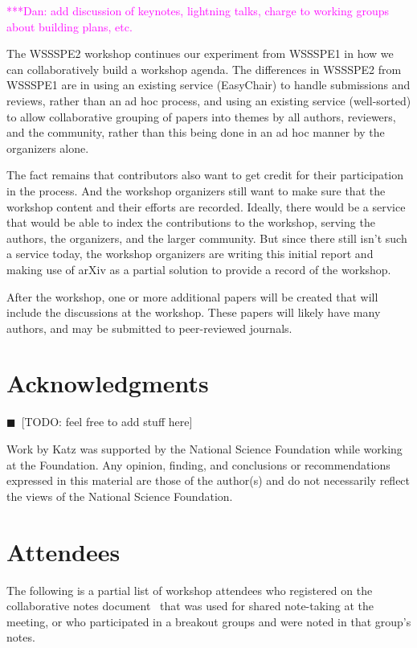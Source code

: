 \documentclass[11pt, oneside]{amsart}
\newcommand{\todo}[1]{{\color{blue}$\blacksquare$~\textsf{[TODO: #1]}}}
\newcommand{\katznote}[1]{ {\textcolor{magenta}    { ***Dan:      #1 }}}
\begin{document}
\katznote{add discussion of keynotes, lightning talks, charge to working groups about building plans, etc.}

The WSSSPE2 workshop continues our experiment from WSSSPE1 in how we can
collaboratively build a workshop agenda. The differences in WSSSPE2 from WSSSPE1
are in using an existing service (EasyChair) to handle submissions and reviews,
rather than an ad hoc process, and using an existing service (well-sorted) to
allow collaborative grouping of papers into themes by all authors, reviewers,
and the community, rather than this being done in an ad hoc manner by the
organizers alone. 

The fact remains that contributors also want to get credit for their
participation in the process. And the workshop organizers still want to make
sure that the workshop content and their efforts are recorded. Ideally, there
would be a service that would be able to index the contributions to the
workshop, serving the authors, the organizers, and the larger community. But
since there still isn't such a service today, the workshop organizers are
writing this initial report and making use of arXiv as a partial solution to
provide a record of the workshop.

After the workshop, one or more additional papers will be created that will
include the discussions at the workshop. These papers will likely have many
authors, and may be submitted to peer-reviewed journals.

\section*{Acknowledgments} \label{sec:acks}
\todo{feel free to add stuff here}

Work by Katz was supported by the National
Science Foundation while working at the Foundation.  Any opinion, finding, and
conclusions or recommendations expressed in this material are those of the
author(s) and do not necessarily reflect the views of the National Science
Foundation.


\appendix
\section{Attendees}  \label{sec:attendees}
The following is a partial list of workshop attendees who registered on the
collaborative notes document~\cite{WSSSPE2-google-notes} that was used
for shared note-taking at the meeting, or who participated in a breakout groups
and were noted in that group's notes.
\end{document}
